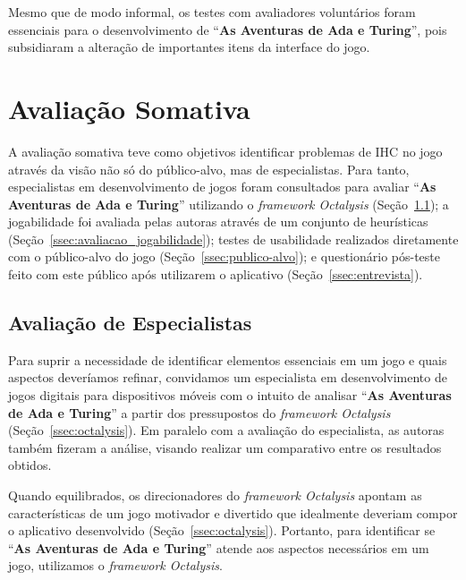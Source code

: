 
Mesmo que de modo informal, os testes com avaliadores voluntários foram essenciais para o desenvolvimento de “\textbf{As Aventuras de Ada e Turing}”, pois subsidiaram a alteração de importantes itens da interface do jogo.

\section{Avaliação Somativa} \label{sec:somativa}

A avaliação somativa teve como objetivos identificar problemas de \acrshort{IHC} no jogo através da visão não só do público-alvo, mas de especialistas. Para tanto, especialistas em desenvolvimento de jogos foram consultados para avaliar “\textbf{As Aventuras de Ada e Turing}” utilizando o \textit{framework Octalysis} (Seção~\ref{ssec:especialistas}); a jogabilidade foi avaliada pelas autoras através de um conjunto de heurísticas (Seção~\ref{ssec:avaliacao_jogabilidade}); testes de usabilidade realizados diretamente com o público-alvo do jogo (Seção~\ref{ssec:publico-alvo}); e questionário pós-teste feito com este público após utilizarem o aplicativo (Seção~\ref{ssec:entrevista}).
\subsection{Avaliação de Especialistas} \label{ssec:especialistas}

Para suprir a necessidade de identificar elementos essenciais em um jogo e quais aspectos deveríamos refinar, convidamos um especialista em desenvolvimento de jogos digitais para dispositivos móveis com o intuito de analisar “\textbf{As Aventuras de Ada e Turing}” a partir dos pressupostos do \textit{framework Octalysis} (Seção~\ref{ssec:octalysis}). Em paralelo com a avaliação do especialista, as autoras também fizeram a análise, visando realizar um comparativo entre os resultados obtidos.

Quando equilibrados, os direcionadores do \textit{framework Octalysis} apontam as características de um jogo motivador e divertido que idealmente deveriam compor o aplicativo desenvolvido (Seção~\ref{ssec:octalysis}).  Portanto, para identificar se “\textbf{As Aventuras de Ada e Turing}” atende aos aspectos necessários em um jogo, utilizamos o \textit{framework Octalysis}.


